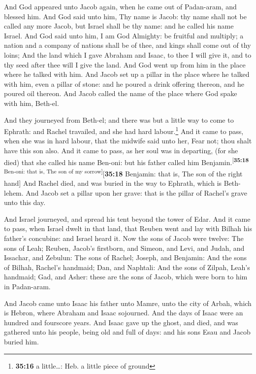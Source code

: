  And God appeared unto Jacob again, when he came out of
Padan-aram, and blessed him.  And God said unto him, Thy
name is Jacob: thy name shall not be called any more Jacob, but Israel
shall be thy name: and he called his name Israel.  And
God said unto him, I am God Almighty: be fruitful and multiply; a nation
and a company of nations shall be of thee, and kings shall come out of
thy loins;  And the land which I gave Abraham and Isaac,
to thee I will give it, and to thy seed after thee will I give the land.
 And God went up from him in the place where he talked
with him.  And Jacob set up a pillar in the place where
he talked with him, even a pillar of stone: and he poured a drink
offering thereon, and he poured oil thereon.  And Jacob
called the name of the place where God spake with him, Beth-el.

 And they journeyed from Beth-el; and there was but a
little way to come to Ephrath: and Rachel travailed, and she had hard
labour.\footnote{\textbf{35:16} a little\ldots: Heb. a little piece of
  ground}  And it came to pass, when she was in hard
labour, that the midwife said unto her, Fear not; thou shalt have this
son also.  And it came to pass, as her soul was in
departing, (for she died) that she called his name Ben-oni: but his
father called him Benjamin.\textsuperscript{{[}\textbf{35:18} Ben-oni:
that is, The son of my sorrow{]}}{[}\textbf{35:18} Benjamin: that is,
The son of the right hand{]}  And Rachel died, and was
buried in the way to Ephrath, which is Beth-lehem.  And
Jacob set a pillar upon her grave: that is the pillar of Rachel's grave
unto this day.

 And Israel journeyed, and spread his tent beyond the
tower of Edar.  And it came to pass, when Israel dwelt in
that land, that Reuben went and lay with Bilhah his father's concubine:
and Israel heard it. Now the sons of Jacob were twelve: 
The sons of Leah; Reuben, Jacob's firstborn, and Simeon, and Levi, and
Judah, and Issachar, and Zebulun:  The sons of Rachel;
Joseph, and Benjamin:  And the sons of Bilhah, Rachel's
handmaid; Dan, and Naphtali:  And the sons of Zilpah,
Leah's handmaid; Gad, and Asher: these are the sons of Jacob, which were
born to him in Padan-aram.

 And Jacob came unto Isaac his father unto Mamre, unto
the city of Arbah, which is Hebron, where Abraham and Isaac sojourned.
 And the days of Isaac were an hundred and fourscore
years.  And Isaac gave up the ghost, and died, and was
gathered unto his people, being old and full of days: and his sons Esau
and Jacob buried him.

